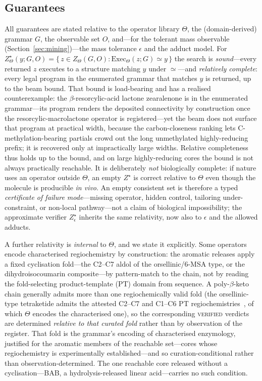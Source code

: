 \documentclass[11pt]{article}
\theoremstyle{definition}
\begin{document}
\subsection{Guarantees}
\label{sec:guarantees}
All guarantees are stated relative to the operator library $\Theta$, the (domain-derived) grammar
$G$, the observable set $O$, and---for the tolerant mass observable (Section~\ref{sec:mining})---the
mass tolerance $\epsilon$ and the adduct model. For
$Z^{\star}_{\Theta}(y;G,O)=\{\,z\in Z_{\Theta}(G,O):\mathrm{Exec}_{\Theta}(z;G)\simeq y\,\}$
the search is \emph{sound}---every returned $z$ executes to a structure matching $y$ under
$\simeq$---and \emph{relatively complete}: every legal program in the enumerated grammar that
matches $y$ is returned, up to the beam bound. That bound is load-bearing and has a realised
counterexample: the $\beta$-resorcylic-acid lactone zearalenone is in the enumerated grammar---its program
renders the deposited connectivity by construction once the resorcylic-macrolactone operator is
registered---yet the beam does not surface that program at practical width, because the carbon-closeness
ranking lets C-methylation-bearing partials crowd out the long unmethylated highly-reducing prefix; it is
recovered only at impractically large widths. Relative completeness thus holds up to the bound, and on
large highly-reducing cores the bound is not always practically reachable. It is deliberately \emph{not}
biologically complete:
if nature uses an operator outside $\Theta$, an empty $Z^{\star}$ is correct relative to $\Theta$
even though the molecule is producible \emph{in vivo}. An empty consistent set is therefore a typed
\emph{certificate of failure mode}---missing operator, hidden control, tailoring under-constraint,
or non-local pathway---not a claim of biological impossibility; the approximate verifier
$Z^{\star}_{\epsilon}$ inherits the same relativity, now also to $\epsilon$ and the allowed adducts.

A further relativity is \emph{internal} to $\Theta$, and we state it explicitly. Some operators encode
characterised regiochemistry by construction: the aromatic releases apply a fixed cyclisation
fold---the C2--C7 aldol of the orsellinic/6-MSA type, or the dihydroisocoumarin composite---by
pattern-match to the chain, not by reading the fold-selecting product-template (PT) domain from
sequence. A poly-$\beta$-keto chain generally admits more than one regiochemically valid fold (the
orsellinic-type tetraketide admits the attested C2--C7 and C1--C6 PT regiochemistries~\citep{ptregio},
of which $\Theta$ encodes the characterised one), so the corresponding \textsc{verified} verdicts are
determined \emph{relative to that curated fold} rather than by observation of the register. That fold
is the grammar's encoding of characterised enzymology, justified for the aromatic members of the
reachable set---cores whose regiochemistry is experimentally established---and so curation-conditional
rather than observation-determined. The one reachable core released without a cyclisation---BAB, a
hydrolysis-released linear acid---carries no such condition.
\end{document}
